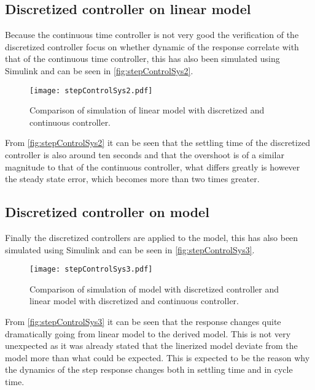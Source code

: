 \subsection{Discretized controller on linear model}
Because the continuous time controller is not very good the verification of the discretized controller focus on whether dynamic of the response correlate with that of the continuous time controller, this has also been simulated using Simulink and can be seen in \autoref{fig:stepControlSys2}.
\begin{figure}[H]
\centering
\texttt{[image: stepControlSys2.pdf]}
\caption{Comparison of simulation of linear model with discretized and continuous controller.}
\label{fig:stepControlSys2}
\end{figure}
From \autoref{fig:stepControlSys2} it can be seen that the settling time of the discretized controller is also around ten seconds and that the overshoot is of a similar magnitude to that of the continuous controller, what differs greatly is however the steady state error, which becomes more than two times greater.  
\subsection{Discretized controller on model}
Finally the discretized controllers are applied to the model, this has also been simulated using Simulink and can be seen in \autoref{fig:stepControlSys3}.
\begin{figure}[H]
\centering
\texttt{[image: stepControlSys3.pdf]}
\caption{Comparison of simulation of model with discretized controller and linear model with discretized and continuous controller.}
\label{fig:stepControlSys3}
\end{figure}
From \autoref{fig:stepControlSys3} it can be seen that the response changes quite dramatically going from linear model to the derived model. This is not very unexpected as it was already stated that the linerized model deviate from the model more than what could be expected. This is expected to be the reason why the dynamics of the step response changes both in settling time and in cycle time. 
